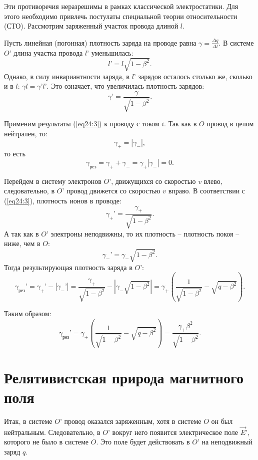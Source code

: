 	Эти противоречия неразрешимы в рамках классической электростатики. Для этого
    необходимо привлечь постулаты специальной теории относительности (СТО).
    Рассмотрим заряженный участок провода длиной \( l \).
	
	Пусть линейная (погонная) плотность заряда на проводе равна \( \gamma =
    \frac{\Delta q}{\Delta l} \). В системе \( O’ \) длина участка провода
    \( l’ \) уменьшилась:
	\[
        l’ = l\sqrt{1 - \beta^2}.
    \]
	Однако, в силу инвариантности заряда, в \( l’ \) зарядов осталось столько
    же, сколько и в \( l \): \( \gamma l = \gamma’ l’ \). Это означает, что
    увеличилась плотность зарядов:
	\begin{equation}
		\gamma’ = \frac{\gamma}{\sqrt{1 - \beta^2}}.
        \label{eq24:3}
	\end{equation}
	
	Применим результаты (\ref{eq24:3}) к проводу с током \( i \). Так как в
    \( O \) провод в целом нейтрален, то:
	\[
        \gamma_+ =|\gamma_-|,
    \]
	то есть
	\[
        \gamma_\textit{рез} = \gamma_+ + \gamma_- = \gamma_+ |\gamma_-| = 0.
    \]
	
	Перейдем в систему электронов \( O’ \), движущихся со скоростью \( v \)
    влево, следовательно, в \( O’ \) провод движется со скоростью \( v \)
    вправо. В соответствии с (\ref{eq24:3}), плотность ионов в проводе:
	\[
        \gamma_+{’} = \frac{\gamma_+}{\sqrt{1 - \beta^2}}.
    \]
	А так как в \( O’ \) электроны неподвижны, то их плотность  -- плотность
    покоя -- ниже, чем в \( O \):
	\[
        \gamma_-{’} = \gamma_-\sqrt{1 - \beta^2}.
    \]
	Тогда результирующая плотность заряда в \( O’ \):
	\[
        \gamma_\textit{рез}{’} = \gamma_+{’} - |\gamma_-{’}| =
        \frac{\gamma_+}{\sqrt{1 - \beta^2}} - |\gamma_-\sqrt{1-\beta^2}| =
        \gamma_+\left(\frac{1}{\sqrt{1 - \beta^2}} - \sqrt{q - \beta^2}\right).
    \]
	
	Таким образом:
	\begin{equation}
		\gamma_\textit{рез}{’} = \gamma_+\left(\frac{1}{\sqrt{1 - \beta^2}} -
        \sqrt{q - \beta^2}\right) = \frac{\gamma_+\beta^2}{\sqrt{1 - \beta^2}}.
        \label{eq24:4}
	\end{equation}

\section{Релятивистская природа магнитного поля}

	Итак, в системе \( O’ \) провод оказался заряженным, хотя в системе \( O \)
    он был нейтральным. Следовательно, в \( O’ \) вокруг него появится
    электрическое поле \( \vec{E}{’} \), которого не было в системе \( O \).
	Это поле будет действовать в \( O’ \) на неподвижный заряд \( q \).
	

